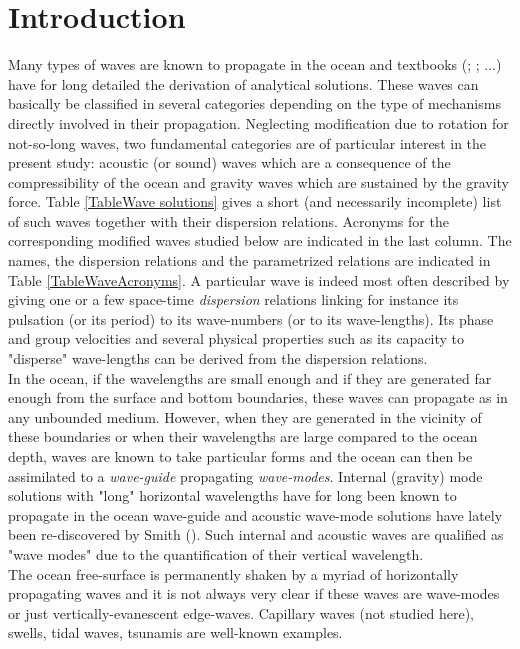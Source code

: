 \documentclass[a4paper,11pt]{article}
\begin{document}
\section{Introduction}
Many types of waves are known to propagate in the ocean and textbooks (\cite{LeBlond_Mysak_1981}; \cite{gill_1982}; \cite{Pedlosky_1982}...) have for long detailed the derivation of analytical solutions. These waves can basically be classified in several categories depending on the type of mechanisms directly involved in their propagation. Neglecting modification due to rotation for not-so-long waves, two fundamental categories are of particular interest in the present study: acoustic (or sound) waves which are a consequence of the compressibility of the ocean and gravity waves which are sustained by the gravity force. Table \ref{TableWave solutions} gives a short (and necessarily incomplete) list of such waves together with their dispersion relations. Acronyms for the corresponding modified waves studied below are indicated in the last column. The names, the dispersion relations and the parametrized relations are indicated in Table \ref{TableWaveAcronyms}. A particular wave is indeed most often described by giving one or a few space-time \textit{dispersion} relations linking for instance its pulsation (or its period) to its wave-numbers (or to its wave-lengths). Its phase and group velocities and several physical properties such as its capacity to "disperse" wave-lengths can be derived from the dispersion relations.\\
In the ocean, if the wavelengths are small enough and if they are generated far enough from the surface and bottom boundaries, these waves can propagate as in any unbounded medium. However, when they are generated in the vicinity of these boundaries or when their wavelengths are large compared to the ocean depth, waves are known to take particular forms and the ocean can then be assimilated to a \textit{wave-guide} propagating \textit{wave-modes}. Internal (gravity) mode solutions with "long" horizontal wavelengths have for long been known to propagate in the ocean wave-guide and acoustic wave-mode solutions have lately been re-discovered by Smith (\cite{smith_2015}). Such internal and acoustic waves are qualified as "wave modes" due to the quantification of their vertical wavelength.\\
The ocean free-surface is permanently shaken by a myriad of horizontally propagating waves and it is not always very clear if these waves are wave-modes or just vertically-evanescent edge-waves. Capillary waves (not studied here), swells, tidal waves, tsunamis are well-known examples.\\
\end{document}
